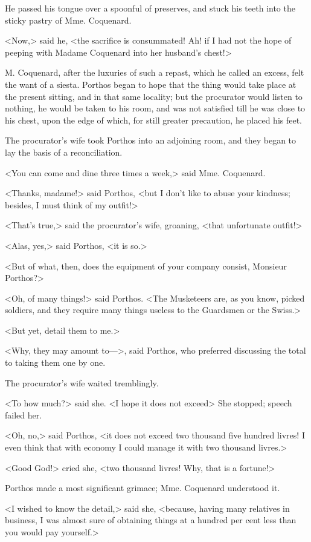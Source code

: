 He passed his tongue over a spoonful of preserves, and stuck his teeth into the sticky pastry of Mme. Coquenard. 

<Now,> said he, <the sacrifice is consummated! Ah! if I had not the hope of peeping with Madame Coquenard into her husband's chest!> 

M. Coquenard, after the luxuries of such a repast, which he called an excess, felt the want of a siesta. Porthos began to hope that the thing would take place at the present sitting, and in that same locality; but the procurator would listen to nothing, he would be taken to his room, and was not satisfied till he was close to his chest, upon the edge of which, for still greater precaution, he placed his feet. 

The procurator's wife took Porthos into an adjoining room, and they began to lay the basis of a reconciliation. 

<You can come and dine three times a week,> said Mme. Coquenard. 

<Thanks, madame!> said Porthos, <but I don't like to abuse your kindness; besides, I must think of my outfit!> 

<That's true,> said the procurator's wife, groaning, <that unfortunate outfit!> 

<Alas, yes,> said Porthos, <it is so.> 

<But of what, then, does the equipment of your company consist, Monsieur Porthos?> 

<Oh, of many things!> said Porthos. <The Musketeers are, as you know, picked soldiers, and they require many things useless to the Guardsmen or the Swiss.> 

<But yet, detail them to me.> 

<Why, they may amount to--->, said Porthos, who preferred discussing the total to taking them one by one. 

The procurator's wife waited tremblingly. 

<To how much?> said she. <I hope it does not exceed\longdash> She stopped; speech failed her. 

<Oh, no,> said Porthos, <it does not exceed two thousand five hundred livres! I even think that with economy I could manage it with two thousand livres.> 

<Good God!> cried she, <two thousand livres! Why, that is a fortune!> 

Porthos made a most significant grimace; Mme. Coquenard understood it. 

<I wished to know the detail,> said she, <because, having many relatives in business, I was almost sure of obtaining things at a hundred per cent less than you would pay yourself.> 

